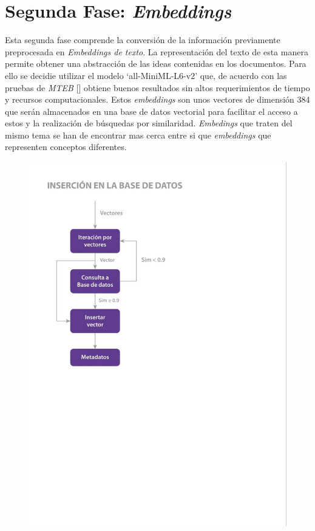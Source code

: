     \section{Segunda Fase: \emph{Embeddings}}
    Esta segunda fase comprende la conversión de la información previamente preprocesada en \emph{Embeddings de texto}.
    La representación del texto de esta manera permite obtener una abstracción de las ideas contenidas en los documentos. 
    Para ello se decidie utilizar el modelo `all-MiniML-L6-v2' que, de acuerdo con las pruebas de \emph{MTEB} [\cite{leaderboard}] obtiene buenos resultados sin altos requerimientos de tiempo y recursos computacionales. Estos \emph{embeddings} son unos vectores de dimensión 384 que serán almacenados en una base de datos vectorial para facilitar el acceso a estos y la realización de búsquedas por similaridad. \emph{Embedings} que traten del mismo tema se han de encontrar mas cerca entre si que \emph{embeddings} que representen conceptos diferentes.

    \begin{figure}[H]    
        \centering
        \includegraphics[scale = 1]{Figures/pipeline_2.jpg}
        \caption*{}
    \end{figure}

